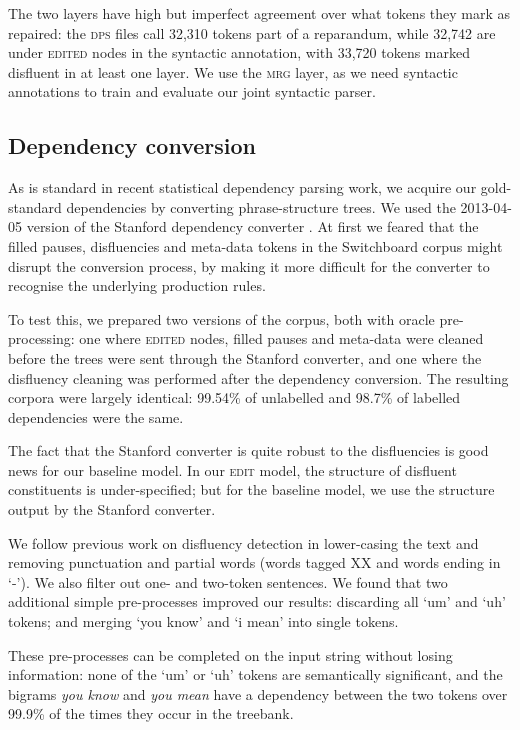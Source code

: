 \documentclass[11pt,letterpaper]{article}
\begin{document}
The two layers have high but imperfect agreement over
what tokens they mark as repaired: the \textsc{dps} files call
32,310 tokens part of a reparandum, while 32,742 are under \textsc{edited} nodes in
the syntactic annotation, with 33,720 tokens marked disfluent in at least one layer.
We use the \textsc{mrg} layer, as we need syntactic annotations to train and
evaluate our joint syntactic parser.

\subsection{Dependency conversion}
\label{sec:deps}
As is standard in recent statistical dependency parsing work, we acquire our
gold-standard dependencies by converting phrase-structure trees.
We used the 2013-04-05 version of the Stanford dependency converter \citep{stanford_deps}.
At first we feared that the filled pauses, disfluencies and meta-data tokens in
the Switchboard corpus might disrupt the conversion process, by making it more
difficult for the converter to recognise the underlying production rules.

To test this, we prepared two versions of the corpus, both with oracle pre-processing:
one where \textsc{edited} nodes, filled pauses and meta-data were cleaned before
the trees were sent through the Stanford converter, and one where the disfluency
cleaning was performed after the dependency conversion. The resulting corpora
were largely identical: 99.54\% of unlabelled and 98.7\% of labelled dependencies
were the same.

The fact that the Stanford converter is quite robust to the disfluencies is good news
for our baseline model. In our \textsc{edit} model, the structure of disfluent
constituents is under-specified; but for the baseline model, we use the structure
output by the Stanford converter.

We follow previous work on disfluency detection in lower-casing the text and
removing punctuation and partial words (words tagged XX and words ending in
`-').  We also filter out one- and two-token sentences.
We found that two additional simple pre-processes improved our results: discarding
all `um' and `uh' tokens; and merging `you know' and `i mean' into single tokens.

These pre-processes can be completed on the input string without losing information:
none of the `um' or `uh' tokens are semantically significant, and
the bigrams \emph{you know} and \emph{you mean} have a dependency between the two
tokens over 99.9\% of the times they occur in the treebank.
\end{document}
